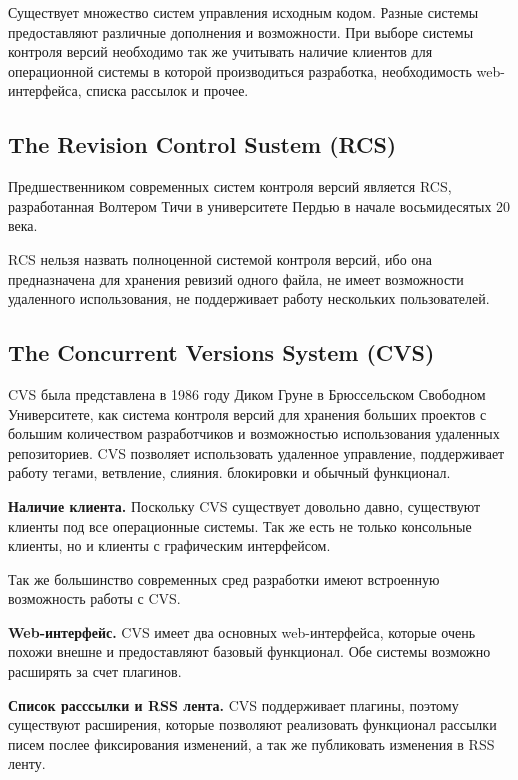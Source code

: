 Существует множество систем управления исходным кодом. Разные системы предоставляют различные дополнения и возможности. При выборе системы контроля версий необходимо так же учитывать наличие клиентов для операционной системы в которой производиться разработка, необходимость web-интерфейса, списка рассылок и прочее.

 \subsection{ The Revision Control Sustem (RCS) } \label{sect3_4_1}
 
 Предшественником современных систем контроля версий является RCS, разработанная Волтером Тичи в университете Пердью в начале восьмидесятых 20 века.
 
 RCS нельзя назвать полноценной системой контроля версий, ибо она предназначена для хранения ревизий одного файла, не имеет возможности удаленного использования, не поддерживает работу нескольких пользователей.
 
\subsection{ The Concurrent Versions System (CVS) } \label{sect3_4_2}

CVS была представлена в 1986 году Диком Груне в Брюссельском Свободном Университете, как система контроля версий для хранения больших проектов с большим количеством разработчиков и возможностью использования удаленных репозиториев.  CVS позволяет использовать удаленное управление, поддерживает работу  тегами, ветвление, слияния. блокировки и обычный функционал.

\textbf{Наличие клиента.} Поскольку CVS существует довольно давно, существуют клиенты под все операционные системы. Так же есть не только консольные клиенты, но и клиенты с графическим интерфейсом.

Так же большинство современных сред разработки имеют встроенную возможность работы с CVS.

\textbf{Web-интерфейс.} CVS имеет два основных web-интерфейса, которые очень похожи внешне и предоставляют базовый функционал. Обе системы возможно расширять за счет плагинов.

\textbf{Список расссылки и RSS лента.} CVS поддерживает плагины, поэтому существуют расширения,  которые позволяют реализовать функционал рассылки писем послее фиксирования изменений, а так же публиковать изменения в RSS ленту.

